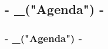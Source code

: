 \subsection{ {{- _("Agenda") -}} }
\begin{frame}
  \frametitle{ {{- _("Agenda") -}} }
  \tableofcontents
\end{frame}
